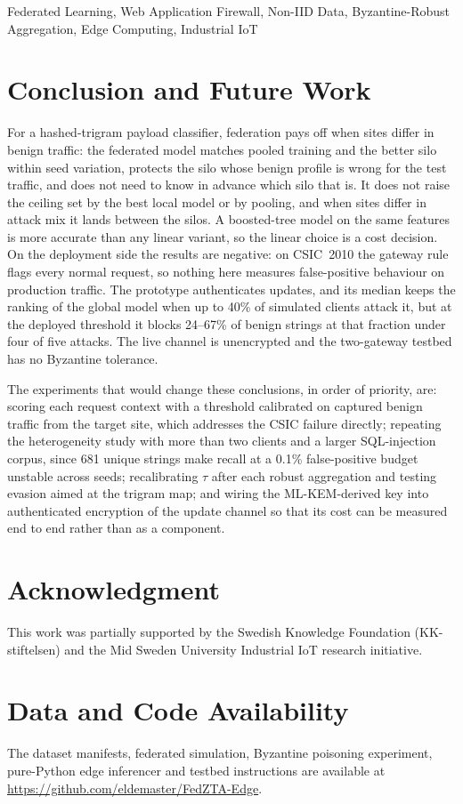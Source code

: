 \documentclass[conference]{IEEEtran}
\begin{document}
\begin{IEEEkeywords}
Federated Learning, Web Application Firewall, Non-IID Data, Byzantine-Robust Aggregation, Edge Computing, Industrial IoT
\end{IEEEkeywords}







\section{Conclusion and Future Work}
\label{sec:conclusion}

For a hashed-trigram payload classifier, federation pays off when sites differ in benign traffic: the federated model matches pooled training and the better silo within seed variation, protects the silo whose benign profile is wrong for the test traffic, and does not need to know in advance which silo that is. It does not raise the ceiling set by the best local model or by pooling, and when sites differ in attack mix it lands between the silos. A boosted-tree model on the same features is more accurate than any linear variant, so the linear choice is a cost decision. On the deployment side the results are negative: on CSIC~2010 the gateway rule flags every normal request, so nothing here measures false-positive behaviour on production traffic. The prototype authenticates updates, and its median keeps the ranking of the global model when up to 40\% of simulated clients attack it, but at the deployed threshold it blocks 24--67\% of benign strings at that fraction under four of five attacks. The live channel is unencrypted and the two-gateway testbed has no Byzantine tolerance.

The experiments that would change these conclusions, in order of priority, are: scoring each request context with a threshold calibrated on captured benign traffic from the target site, which addresses the CSIC failure directly; repeating the heterogeneity study with more than two clients and a larger SQL-injection corpus, since 681 unique strings make recall at a 0.1\% false-positive budget unstable across seeds; recalibrating $\tau$ after each robust aggregation and testing evasion aimed at the trigram map; and wiring the ML-KEM-derived key into authenticated encryption of the update channel so that its cost can be measured end to end rather than as a component.

\section*{Acknowledgment}
This work was partially supported by the Swedish Knowledge Foundation (KK-stiftelsen) and the Mid Sweden University Industrial IoT research initiative.

\section*{Data and Code Availability}
The dataset manifests, federated simulation, Byzantine poisoning experiment, pure-Python edge inferencer and testbed instructions are available at \url{https://github.com/eldemaster/FedZTA-Edge}.



\end{document}
